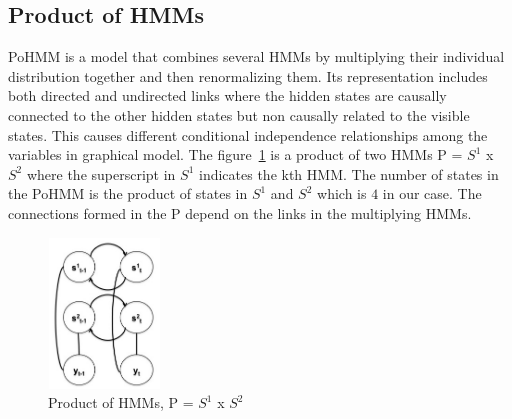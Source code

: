 \documentclass{sig-alternate}
\begin{document}

\subsection{Product of HMMs}
\label {sec:pohmm}
PoHMM is a model that combines several HMMs by multiplying their individual distribution together and then renormalizing them. Its representation includes both directed and undirected links where the hidden states are causally connected to the other hidden states but non causally related to the visible states. This causes different conditional independence relationships among the variables in graphical model. 
The figure~\ref{fig:product} is a product of two HMMs P = $S^1$ x $S^2$ where the superscript in $S^1$ indicates the kth HMM. The number of states in the PoHMM is the product of states in $S^1$ and $S^2$ which is $4$ in our case. The connections formed in the P depend on the links in the multiplying HMMs. 



 \begin{figure}[t]
\centering
\includegraphics[width=3cm,height=4cm]{product.jpg}
\caption{Product of HMMs, P = $S^{1}$ x $S^2$}
\label{fig:product}
\end{figure}
\end{document}
